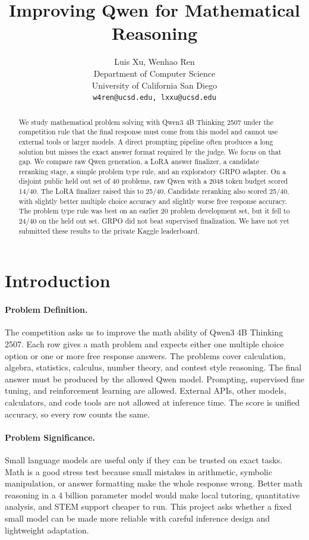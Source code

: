 \documentclass[11pt]{article}
\title{
  Improving Qwen for Mathematical Reasoning
}
\author{%
  Luis Xu, Wenhao Ren\\
  Department of Computer Science\\
  University of California San Diego\\
  \texttt{w4ren@ucsd.edu, lxxu@ucsd.edu}
}
\begin{document}
\maketitle

\begin{abstract}
We study mathematical problem solving with Qwen3 4B Thinking 2507 under the competition rule that the final response must come from this model and cannot use external tools or larger models. A direct prompting pipeline often produces a long solution but misses the exact answer format required by the judge. We focus on that gap. We compare raw Qwen generation, a LoRA answer finalizer, a candidate reranking stage, a simple problem type rule, and an exploratory GRPO adapter. On a disjoint public held out set of 40 problems, raw Qwen with a 2048 token budget scored 14/40. The LoRA finalizer raised this to 25/40. Candidate reranking also scored 25/40, with slightly better multiple choice accuracy and slightly worse free response accuracy. The problem type rule was best on an earlier 20 problem development set, but it fell to 24/40 on the held out set. GRPO did not beat supervised finalization. We have not yet submitted these results to the private Kaggle leaderboard.
\end{abstract}

\section{Introduction}
\label{sec:intro}

\paragraph{Problem Definition.}
The competition asks us to improve the math ability of Qwen3 4B Thinking 2507. Each row gives a math problem and expects either one multiple choice option or one or more free response answers. The problems cover calculation, algebra, statistics, calculus, number theory, and contest style reasoning. The final answer must be produced by the allowed Qwen model. Prompting, supervised fine tuning, and reinforcement learning are allowed. External APIs, other models, calculators, and code tools are not allowed at inference time. The score is unified accuracy, so every row counts the same.

\paragraph{Problem Significance.}
Small language models are useful only if they can be trusted on exact tasks. Math is a good stress test because small mistakes in arithmetic, symbolic manipulation, or answer formatting make the whole response wrong. Better math reasoning in a 4 billion parameter model would make local tutoring, quantitative analysis, and STEM support cheaper to run. This project asks whether a fixed small model can be made more reliable with careful inference design and lightweight adaptation.
\end{document}
